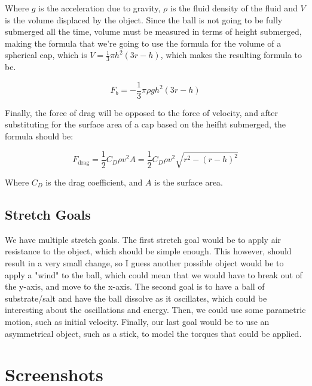 \documentclass{article}
\begin{document}
Where $g$ is the acceleration due to gravity, $\rho$ is the fluid density of the fluid and $V$ is the volume displaced by the object. Since the ball is not going to be fully submerged all the time, volume must be measured in terms of height submerged, making the formula that we're going to use the formula for the volume of a spherical cap, which is $V = \frac{1}{3}\pi h^2 (3r - h)$, which makes the resulting formula to be.

$$F_b = - \frac{1}{3} \pi \rho g h^2 (3r - h)$$

Finally, the force of drag will be opposed to the force of velocity, and after substituting for the surface area of a cap based on the heifht submerged, the formula should be:

$$F_{\text{drag}} = \frac{1}{2} C_D \rho v^2 A = \frac{1}{2} C_D \rho v^2 \sqrt{r^2 - (r-h)^2}$$

Where $C_D$ is the drag coefficient, and $A$ is the surface area.

\subsection{Stretch Goals}

We have multiple stretch goals. The first stretch goal would be to apply air resistance to the object, which should be simple enough. This however, should result in a very small change, so I guess another possible object would be to apply a "wind" to the ball, which could mean that we would have to break out of the y-axis, and move to the x-axis. The second goal is to have a ball of substrate/salt and have the ball dissolve as it oscillates, which could be interesting about the oscillations and energy. Then, we could use some parametric motion, such as initial velocity. Finally, our last goal would be to use an asymmetrical object, such as a stick, to model the torques that could be applied.

\break

\section{Screenshots}
\end{document}
